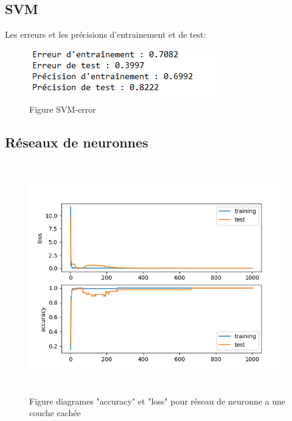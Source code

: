 \subsection{SVM}
\par Les erreurs et les précisions d'entrainement et de test:
\begin{figure}[H]
    \centering
    \includegraphics{svm.png}
    \caption{Figure SVM-error }
    \label{Figure fichier svm-error }
\end{figure}
\subsection{Réseaux de neuronnes}
\begin{figure}[H]
    \centering
    \includegraphics[width=17cm, height=10cm, keepaspectratio]{rn_plot2.png}
    \caption{Figure diagrames "accuracy" et "loss" pour réseau de neuronne a une couche cachée }
    \label{Figure diagrames "accuracy" et "loss" pour réseau de neuronne a une couche cachée }
\end{figure}  
